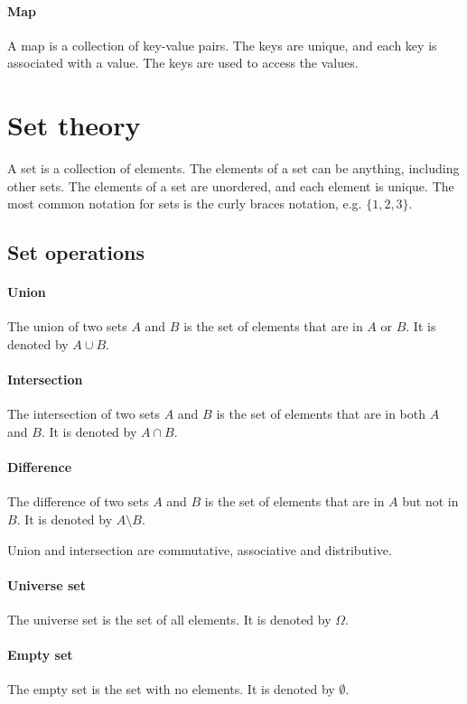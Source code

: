 \paragraph{Map} A map is a collection of key-value pairs.  The keys are unique, and
each key is associated with a value.  The keys are used to access the values.

\section{Set theory}

A set is a collection of elements.  The elements of a set can be anything, including
other sets.  The elements of a set are unordered, and each element is unique.  The
most common notation for sets is the curly braces notation, e.g. $\{1, 2, 3\}$.

\subsection{Set operations}

\paragraph{Union}  The union of two sets $A$ and $B$ is the set of elements that are in
$A$ or $B$.  It is denoted by $A \cup B$.

\paragraph{Intersection}  The intersection of two sets $A$ and $B$ is the set of elements
that are in both $A$ and $B$.  It is denoted by $A \cap B$.

\paragraph{Difference}  The difference of two sets $A$ and $B$ is the set of elements
that are in $A$ but not in $B$.  It is denoted by $A \setminus B$.

Union and intersection are commutative, associative and distributive.

\paragraph{Universe set}  The universe set is the set of all elements.  It is denoted
by $\Omega$.

\paragraph{Empty set}  The empty set is the set with no elements.  It is denoted by
$\emptyset$.

